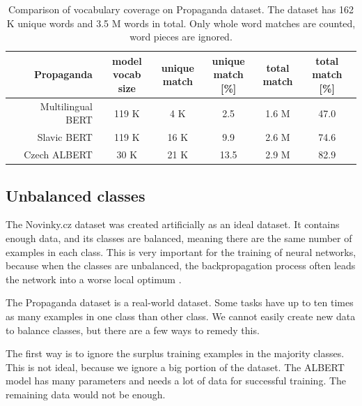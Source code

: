 \documentclass[
  printed, %
  color,   %
  table,   %
  oneside, %
  lof,     %
  lot,     %
]{fithesis3}
\begin{document}
\begin{table}[t!]
\small
\begin{tabular}{r|c|c|c|c|c}
        Propaganda
        & \rotatebox[origin=l]{90}{\parbox{2.2cm}{model \\ vocab size}} 
        & \rotatebox[origin=l]{90}{\parbox{2cm}{unique \\ match}}
        & \rotatebox[origin=l]{90}{\parbox{2cm}{unique \\ match [\%]}}
        & \rotatebox[origin=l]{90}{\parbox{2cm}{total \\ match}}
        & \rotatebox[origin=l]{90}{\parbox{2cm}{total \\ match [\%]}}
        \\ 
    \toprule
    Multilingual BERT      & 119 K  & 4 K   & 2.5  & 1.6 M   & 47.0 \\
    Slavic BERT            & 119 K  & 16 K  & 9.9  & 2.6 M   & 74.6 \\
    Czech ALBERT           & 30 K   & 21 K  & 13.5 & 2.9 M   & 82.9 \\ 
\end{tabular}
\caption[Vocabulary coverage on Propaganda dataset]
{Comparison of vocabulary coverage on Propaganda dataset. The dataset has 162 K unique words and 3.5 M words in total. Only whole word matches are counted, word pieces are ignored.}
\label{tab:vocab-prop-compare}
\end{table} %



\subsection{Unbalanced classes}
The Novinky.cz dataset was created artificially as an ideal dataset. It contains enough data, and its classes are balanced, meaning there are the same number of examples in each class. This is very important for the training of neural networks, because when the classes are unbalanced, the backpropagation process often leads the network into a worse local optimum \parencite{unbalanced}.

The Propaganda dataset is a real-world dataset. Some tasks have up to ten times as many examples in one class than other class. We cannot easily create new data to balance classes, but there are a few ways to remedy this.

The first way is to ignore the surplus training examples in the majority classes. This is not ideal, because we ignore a big portion of the dataset. The ALBERT model has many parameters and needs a lot of data for successful training. The remaining data would not be enough.
\end{document}
